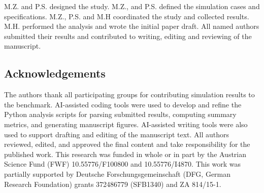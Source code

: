 \documentclass[11pt,a4paper]{article}
\begin{document}
M.Z. and P.S. designed the study. M.Z., and P.S. defined the simulation cases and specifications. M.Z., P.S. and M.H coordinated the study and collected results. M.H. performed the analysis and wrote the initial paper draft. All named authors submitted their results and contributed to writing, editing and reviewing of the manuscript.

\subsection*{Acknowledgements}

The authors thank all participating groups for contributing simulation results to the benchmark. AI-assisted coding tools were used to develop and refine the Python analysis scripts for parsing submitted results, computing summary metrics, and generating manuscript figures. AI-assisted writing tools were also used to support drafting and editing of the manuscript text. All authors reviewed, edited, and approved the final content and take responsibility for the published work.
This research was funded in whole or in part by the Austrian Science Fund (FWF) 10.55776/F100800 and 10.55776/I4870. This work was partially supported by Deutsche Forschungsgemeinschaft (DFG, German Research Foundation) grants 372486779 (SFB1340) and ZA 814/15-1.

%
\vfill\pagebreak
\end{document}
